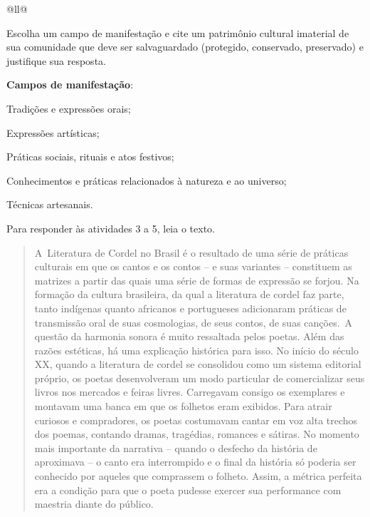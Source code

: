 \begin{itemize}
\begin{itemize}
\begin{escolha}[]{@{}ll@{}}
\begin{quote}
\end{quote}

Escolha um campo de manifestação e cite um patrimônio cultural imaterial
de sua comunidade que deve ser salvaguardado (protegido, conservado,
preservado) e justifique sua resposta.

\textbf{Campos de manifestação}:

\begin{escolha}
\item
  Tradições e expressões orais;
\item
  Expressões artísticas;
\item
  Práticas sociais, rituais e atos festivos;
\item
  Conhecimentos e práticas relacionados à natureza e ao universo;
\item
  Técnicas artesanais.
\end{escolha}



Para responder às atividades 3 a 5, leia o texto.

\begin{quote}
A~Literatura de Cordel no Brasil é o resultado de uma série de
práticas culturais em que os cantos e os contos -- e suas variantes --
constituem as matrizes a partir das quais uma série de formas de
expressão se forjou. Na formação da cultura brasileira, da qual a
literatura de cordel faz parte, tanto indígenas quanto africanos e
portugueses adicionaram práticas de transmissão oral de suas
cosmologias, de seus contos, de suas canções.~A questão da harmonia
sonora é muito ressaltada pelos poetas. Além das razões estéticas, há
uma explicação histórica para isso. No início do século XX, quando a
literatura de cordel se consolidou como um sistema editorial próprio, os
poetas desenvolveram um modo particular de comercializar seus livros nos
mercados e feiras livres. Carregavam consigo os exemplares e montavam
uma banca em que os folhetos eram exibidos. Para atrair curiosos e
compradores, os poetas costumavam cantar em voz alta trechos dos poemas,
contando dramas, tragédias, romances e sátiras. No momento mais
importante da narrativa -- quando o desfecho da história de aproximava
-- o canto era interrompido e o final da história só poderia ser
conhecido por aqueles que comprassem o folheto. Assim, a métrica
perfeita era a condição para que o poeta pudesse exercer sua performance
com maestria diante do público.


\end{quote}
\end{escolha}
\end{itemize}
\end{itemize}
